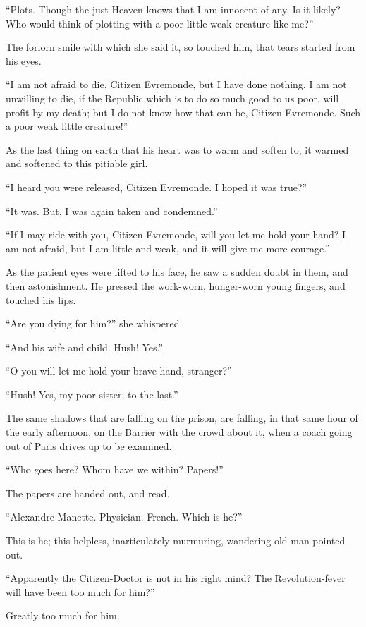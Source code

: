 ``Plots.  Though the just Heaven knows that I am innocent of any.
Is it likely?  Who would think of plotting with a poor little weak
creature like me?''

The forlorn smile with which she said it, so touched him, that tears
started from his eyes.

``I am not afraid to die, Citizen Evremonde, but I have done nothing.
I am not unwilling to die, if the Republic which is to do so much
good to us poor, will profit by my death; but I do not know how that
can be, Citizen Evremonde.  Such a poor weak little creature!''

As the last thing on earth that his heart was to warm and soften to,
it warmed and softened to this pitiable girl.

``I heard you were released, Citizen Evremonde.  I hoped it was true?''

``It was.  But, I was again taken and condemned.''

``If I may ride with you, Citizen Evremonde, will you let me hold your
hand?  I am not afraid, but I am little and weak, and it will give me
more courage.''

As the patient eyes were lifted to his face, he saw a sudden doubt in
them, and then astonishment.  He pressed the work-worn, hunger-worn
young fingers, and touched his lips.

``Are you dying for him?'' she whispered.

``And his wife and child.  Hush!  Yes.''

``O you will let me hold your brave hand, stranger?''

``Hush!  Yes, my poor sister; to the last.''


The same shadows that are falling on the prison, are falling, in that
same hour of the early afternoon, on the Barrier with the crowd about it,
when a coach going out of Paris drives up to be examined.

``Who goes here?  Whom have we within?  Papers!''

The papers are handed out, and read.

``Alexandre Manette.  Physician.  French. Which is he?''

This is he; this helpless, inarticulately murmuring, wandering old
man pointed out.

``Apparently the Citizen-Doctor is not in his right mind?
The Revolution-fever will have been too much for him?''

Greatly too much for him.

